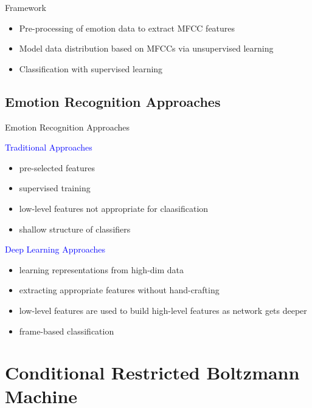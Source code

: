 	\begin{frame}[t]{Framework}
	      \begin{itemize}
	       \item Pre-processing of emotion data to extract MFCC features
	       \item Model data distribution based on MFCCs via unsupervised learning
	       \item Classification with supervised learning
	      \end{itemize}

	\end{frame}
% 
% 
\subsection{Emotion Recognition Approaches}

\begin{frame}[t]{Emotion Recognition Approaches}
	\begin{minipage}[t]{0.48\linewidth}
	  \textcolor{blue}{\Large Traditional Approaches}
	  \begin{itemize}
	   \item pre-selected features
	   \item supervised training
	   \item low-level features not appropriate for claasification
	   \item shallow structure of classifiers
	  \end{itemize}
	\end{minipage}\hfill
	\begin{minipage}[t]{0.48\linewidth}
	\textcolor{blue}{\Large Deep Learning Approaches}
	  \begin{itemize}
	   \item learning representations from high-dim data
	   \item extracting appropriate features without hand-crafting
	   \item low-level features are used to build high-level features as network gets deeper
	   \item frame-based classification
	  \end{itemize}

	\end{minipage}
\end{frame}

\section{Conditional Restricted Boltzmann Machine} %
